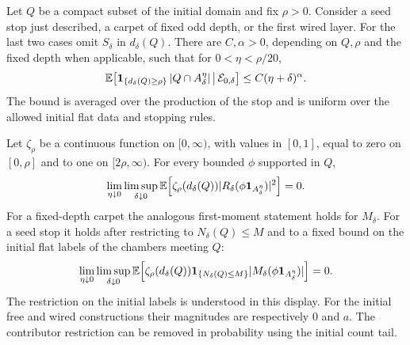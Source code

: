 \begin{lemma}
\label{lem:cut-neighborhoods}
Let \(Q\) be a compact subset of the initial domain and fix \(\rho>0\).
Consider a seed stop just described, a carpet of fixed odd depth, or the
first wired layer. For the last two cases omit \(S_\delta\) in
\(d_\delta(Q)\). There are \(C,\alpha>0\), depending on \(Q,\rho\) and
the fixed depth when applicable, such that for \(0<\eta<\rho/20\),
\begin{equation}
 \mathbb E\!\left[
   \mathbf 1_{\{d_\delta(Q)\ge\rho\}}\,|Q\cap A_\delta^\eta|
       \,\middle|\,\mathcal E_{0,\delta}\right]
 \le C(\eta+\delta)^\alpha .
 \label{eq:cut-area}
\end{equation}
The bound is averaged over the production of the stop and is uniform
over the allowed initial flat data and stopping rules.

Let \(\zeta_\rho\) be a continuous function on \([0,\infty)\), with
values in \([0,1]\), equal to zero on \([0,\rho]\) and to one on
\([2\rho,\infty)\). For every bounded \(\phi\) supported in \(Q\),
\begin{equation}
 \lim_{\eta\downarrow0}\limsup_{\delta\downarrow0}
 \mathbb E\!\left[\zeta_\rho(d_\delta(Q))
       |R_\delta(\phi\mathbf 1_{A_\delta^\eta})|^2\right]=0.
 \label{eq:remainder-neighborhood}
\end{equation}
For a fixed-depth carpet the analogous first-moment statement holds for
\(M_\delta\). For a seed stop it holds after restricting to
\(N_\delta(Q)\le M\) and to a fixed bound on the initial flat labels
of the chambers meeting \(Q\):
\begin{equation}
 \lim_{\eta\downarrow0}\limsup_{\delta\downarrow0}
 \mathbb E\!\left[\zeta_\rho(d_\delta(Q))\mathbf 1_{\{N_\delta(Q)\le M\}}
       |M_\delta(\phi\mathbf 1_{A_\delta^\eta})|\right]=0.
 \label{eq:mean-neighborhood}
\end{equation}
The restriction on the initial labels is understood in this display.
For the initial free and wired constructions their magnitudes are
respectively \(0\) and \(a\). The contributor restriction can be
removed in probability using the initial count tail.
\end{lemma}

